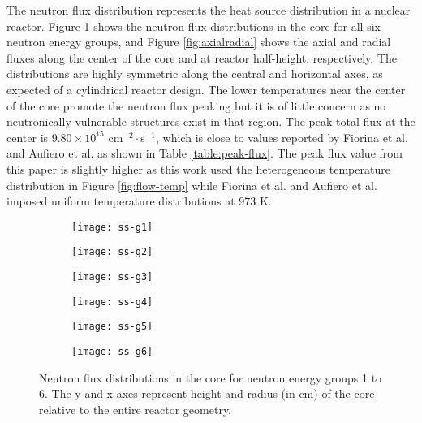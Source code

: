 The neutron flux distribution represents the heat source distribution in a
nuclear reactor. Figure \ref{fig:neutronflux} shows the neutron flux
distributions in the core for all six neutron energy groups, and Figure
\ref{fig:axialradial} shows the axial and radial fluxes along the center of
the core and at reactor half-height, respectively.
The distributions are highly symmetric along the
central and horizontal axes, as expected of a cylindrical reactor design. The
lower temperatures near the center of the core promote the neutron
flux peaking but it is of little concern as no neutronically vulnerable
structures exist in that region. The peak total flux at the center is
$9.80 \times 10^{15}$ cm$^{-2}\cdot$s$^{-1}$, which is close to values
reported by Fiorina et al. \cite{fiorina_molten_2013} and Aufiero et al.
\cite{aufiero_development_2014} as shown in Table \ref{table:peak-flux}. The
peak flux value from this paper is slightly higher as this work used the
heterogeneous temperature distribution in Figure \ref{fig:flow-temp} while
Fiorina et al. and Aufiero et al. imposed uniform temperature distributions
at 973 K.

\begin{figure}[b!]
    \centering
    \begin{subfigure}[t]{.325\textwidth}
        \centering
        \texttt{[image: ss-g1]}
    \end{subfigure}
    \begin{subfigure}[t]{.325\textwidth}
        \centering
        \texttt{[image: ss-g2]}
    \end{subfigure}
    \begin{subfigure}[t]{.325\textwidth}
        \centering
        \texttt{[image: ss-g3]}
    \end{subfigure}
    \begin{subfigure}[t]{.325\textwidth}
        \centering
        \texttt{[image: ss-g4]}
    \end{subfigure}
    \begin{subfigure}[t]{.325\textwidth}
        \centering
        \texttt{[image: ss-g5]}
    \end{subfigure}
    \begin{subfigure}[t]{.325\textwidth}
        \centering
        \texttt{[image: ss-g6]}
    \end{subfigure}
    \caption{Neutron flux distributions in the core for neutron energy groups
    1 to 6. The y and x axes represent height and radius (in cm) of the core
    relative to the entire reactor geometry.}
    \label{fig:neutronflux}
\end{figure}

